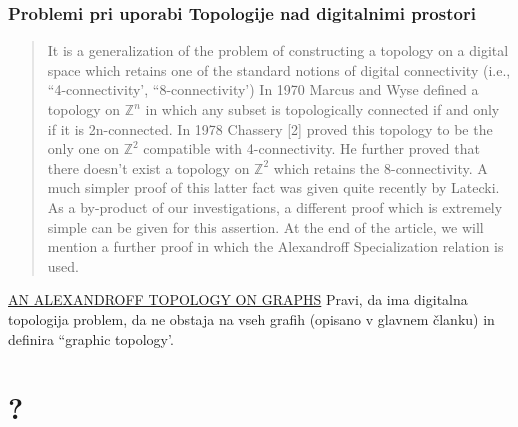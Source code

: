 \documentclass[mat1, tisk]{fmfdelo}
\begin{document}
\subsubsection{Problemi pri uporabi Topologije nad digitalnimi prostori}
\begin{quote}
  It is a generalization of the problem of constructing a topology on a
  digital space which retains one of the standard notions of
  digital connectivity (i.e., ``4-connectivity', ``8-connectivity')
  In 1970 Marcus and Wyse deﬁned a topology on
  $\mathbb{Z}^n$ in which any subset is topologically connected if and
  only if it is 2n-connected. In 1978 Chassery [2] proved this
  topology to be the only one on $\mathbb{Z}^2$ compatible with 4-connectivity.
  He further proved that there doesn't exist a
  topology on $\mathbb{Z}^2$ which retains the 8-connectivity. A much
  simpler proof of this latter fact was given quite recently
  by Latecki. As a by-product of our investigations, a
  different proof which is extremely simple can be given for
  this assertion. At the end of the article, we will mention
  a further proof in which the Alexandroff Specialization
  relation is used.
\end{quote}





\href{http://bims.iranjournals.ir/article_266_e1ff26c6f7b350afcde8bd3ec3654132.pdf}{AN ALEXANDROFF TOPOLOGY ON GRAPHS}
Pravi, da ima digitalna\\ topologija problem, da ne obstaja na vseh grafih
(opisano v glavnem članku) in definira ``graphic topology'.
\section{?}
\end{document}
